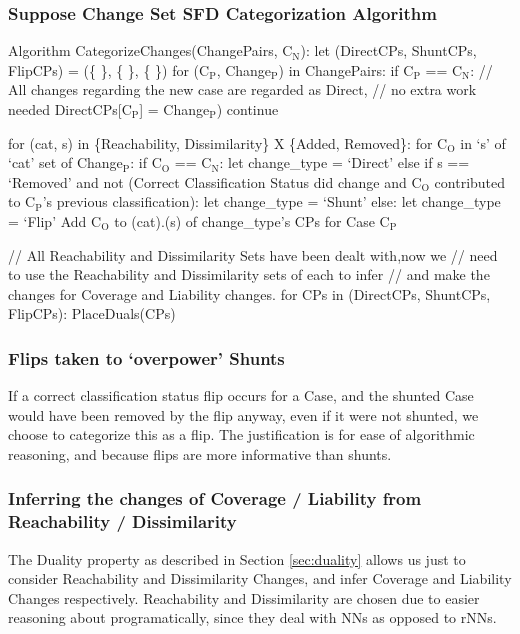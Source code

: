 \documentclass[a4paper,11pt]{report}
\newcommand{\sbt}[1]{\ensuremath{_{\textrm{#1}}}}
\begin{document}
\subsubsection{Suppose Change Set SFD Categorization Algorithm}
\begin{code}
Algorithm CategorizeChanges(ChangePairs, C\sbt{N}):
  let (DirectCPs, ShuntCPs, FlipCPs) = (\{ \}, \{ \}, \{ \})
  for (C\sbt{P}, Change\sbt{P}) in ChangePairs:
    if C\sbt{P} == C\sbt{N}:
      // All changes regarding the new case are regarded as Direct, 
      // no extra work needed
      DirectCPs[C\sbt{P}] = Change\sbt{P})
      continue
    
    for (cat, s) in \{Reachability, Dissimilarity\} X \{Added, Removed\}:
      for C\sbt{O} in `s' of `cat' set of Change\sbt{P}:
        if C\sbt{O} == C\sbt{N}:
          let change_type = `Direct'
        else if s == `Removed' 
            and not (Correct Classification Status did change
                     and C\sbt{O} contributed to C\sbt{P}'s previous classification):
          let change_type = `Shunt'
        else:
          let change_type = `Flip'
      Add C\sbt{O} to (cat).(s) of change_type's CPs for Case C\sbt{P}
    
  // All Reachability and Dissimilarity Sets have been dealt with,now we
  // need to use the Reachability and Dissimilarity sets of each to infer
  // and make the changes for Coverage and Liability changes.
  for CPs in (DirectCPs, ShuntCPs, FlipCPs):
    PlaceDuals(CPs)
\end{code}

\subsubsection{Flips taken to `overpower' Shunts}
If a correct classification status flip occurs for a Case, and the shunted Case would have been removed by the flip anyway, even if it were not shunted, we choose to categorize this as a flip. The justification is for ease of algorithmic reasoning, and because flips are more informative than shunts.

\subsubsection{Inferring the changes of Coverage / Liability from Reachability / Dissimilarity}
The Duality property as described in Section \ref{sec:duality} allows us just to consider Reachability and Dissimilarity Changes, and infer Coverage and Liability Changes respectively. Reachability and Dissimilarity are chosen due to easier reasoning about programatically, since they deal with NNs as opposed to rNNs.
\end{document}
